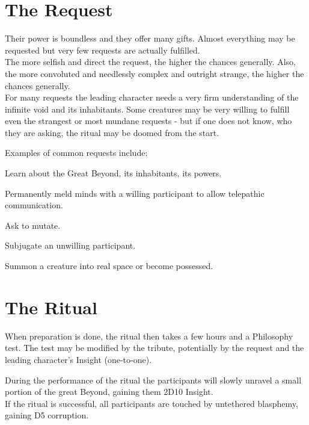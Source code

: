 \documentclass[11pt,a4paper,openany]{book}
\begin{document}
	\section{The Request}
	Their power is boundless and they offer many gifts. Almost everything may be requested but very few requests are actually fulfilled.
	\\
	The more selfish and direct the request, the higher the chances generally.
	Also, the more convoluted and needlessly complex and outright strange, the higher the chances generally.
	\\
	For many requests the leading character needs a very firm understanding of the infinite void and its inhabitants. 
	Some creatures may be very willing to fulfill even the strangest or most mundane requests
		- but if one does not know, who they are asking,
		the ritual may be doomed from the start.
	\par
	Examples of common requests include:
	\begin{sitemize}
		\item Learn about the Great Beyond, its inhabitants, its powers.
		\item Permanently meld minds with a willing participant to allow telepathic communication.
		\item Ask to mutate.
		\item Subjugate an unwilling participant.
		\item Summon a creature into real space or become possessed.
	\end{sitemize}
	\section{The Ritual}
	When preparation is done, the ritual then takes a few hours and a Philosophy test. The test may be modified by the tribute, potentially by the request and the leading character's Insight (one-to-one).
	\par
	During the performance of the ritual the participants will slowly unravel a small portion of the great Beyond, gaining them 2D10 Insight.\\
	If the ritual is successful, all participants are touched by untethered blasphemy, gaining D5 corruption.
\end{document}
